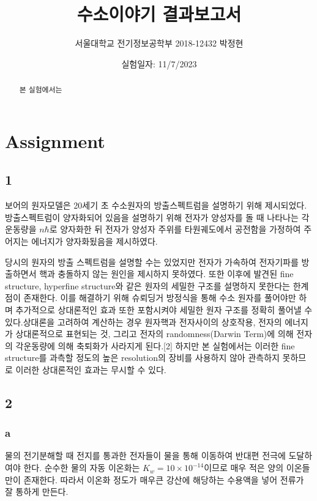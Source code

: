 \documentclass[%
 reprint,
 amsmath,amssymb,
 aps,
]{revtex4-2}
\begin{document}
\title{수소이야기 결과보고서}

\author{서울대학교 전기정보공학부 2018-12432 박정현}
\date{실험일자: 11/7/2023}%

\begin{abstract}
본 실험에서는 
\end{abstract}

\maketitle


\section{\label{sec:level1}Assignment}
\subsection{\label{sec:level2}1}
보어의 원자모델은 20세기 초 수소원자의 방출스펙트럼을 설명하기 위해 제시되었다. 방출스펙트럼이 양자화되어 있음을 설명하기 위해 전자가 양성자를 돌 때 나타나는 각운동량을 $n\hbar$로 양자화한 뒤 전자가 양성자 주위를 타원궤도에서 공전함을 가정하여 주어지는 에너지가 양자화됬음을 제시하였다.

당시의 원자의 방출 스펙트럼을 설명할 수는 있었지만 전자가 가속하여 전자기파를 방출하면서 핵과 충돌하지 않는 원인을 제시하지 못하였다. 또한 이후에 발견된 fine structure, hyperfine structure와 같은 원자의 세밀한 구조를 설명하지 못한다는 한계점이 존재한다. 이를 해결하기 위해 슈뢰딩거 방정식을 통해 수소 원자를 풀어야만 하며 추가적으로 상대론적인 효과 또한 포함시켜야 세밀한 원자 구조를 정확히 풀어낼 수 있다.상대론을 고려하여 계산하는 경우 원자핵과 전자사이의 상호작용, 전자의 에너지가 상대론적으로 표현되는 것, 그리고 전자의 randomness(Darwin Term)에 의해 전자의 각운동량에 의해 축퇴화가 사라지게 된다.[2] 하지만 본 실험에서는 이러한 fine structure를 과측할 정도의 높은 resolution의 장비를 사용하지 않아 관측하지 못하므로 이러한 상대론적인 효과는 무시할 수 있다.

\subsection{\label{sec:level2}2}
\subsubsection{\label{sec:level3}a}
물의 전기분해할 때 전지를 통과한 전자들이 물을 통해 이동하여 반대편 전극에 도달하여야 한다. 순수한 물의 자동 이온화는 $K_{w} = 10\times10^{-14}$이므로 매우 적은 양의 이온들만이 존재한다. 따라서 이온화 정도가 매우큰 강산에 해당하는 수용액을 넣어 전류가 잘 통하게 만든다.
\end{document}
